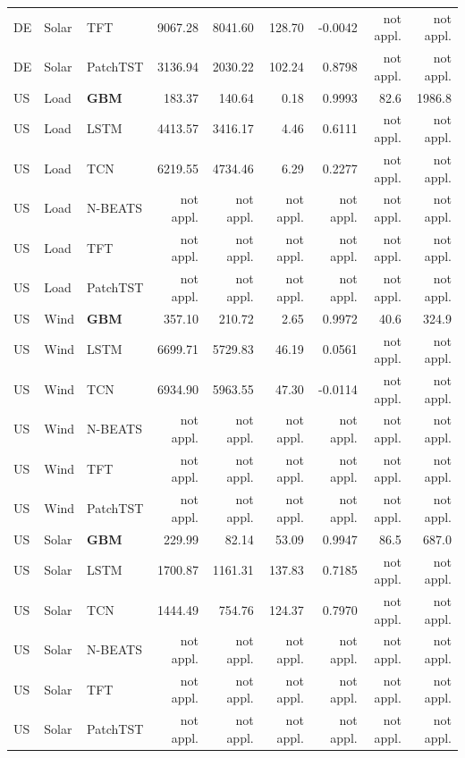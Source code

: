 \begin{table}[htbp]
{\begin{tabular}{lllrrrrrr}
DE & Solar & TFT & 9067.28 & 8041.60 & 128.70 & -0.0042 & not appl. & not appl. \\
DE & Solar & PatchTST & 3136.94 & 2030.22 & 102.24 & 0.8798 & not appl. & not appl. \\
US & Load & \textbf{GBM} & 183.37 & 140.64 & 0.18 & 0.9993 & 82.6 & 1986.8 \\
US & Load & LSTM & 4413.57 & 3416.17 & 4.46 & 0.6111 & not appl. & not appl. \\
US & Load & TCN & 6219.55 & 4734.46 & 6.29 & 0.2277 & not appl. & not appl. \\
US & Load & N-BEATS & not appl. & not appl. & not appl. & not appl. & not appl. & not appl. \\
US & Load & TFT & not appl. & not appl. & not appl. & not appl. & not appl. & not appl. \\
US & Load & PatchTST & not appl. & not appl. & not appl. & not appl. & not appl. & not appl. \\
US & Wind & \textbf{GBM} & 357.10 & 210.72 & 2.65 & 0.9972 & 40.6 & 324.9 \\
US & Wind & LSTM & 6699.71 & 5729.83 & 46.19 & 0.0561 & not appl. & not appl. \\
US & Wind & TCN & 6934.90 & 5963.55 & 47.30 & -0.0114 & not appl. & not appl. \\
US & Wind & N-BEATS & not appl. & not appl. & not appl. & not appl. & not appl. & not appl. \\
US & Wind & TFT & not appl. & not appl. & not appl. & not appl. & not appl. & not appl. \\
US & Wind & PatchTST & not appl. & not appl. & not appl. & not appl. & not appl. & not appl. \\
US & Solar & \textbf{GBM} & 229.99 & 82.14 & 53.09 & 0.9947 & 86.5 & 687.0 \\
US & Solar & LSTM & 1700.87 & 1161.31 & 137.83 & 0.7185 & not appl. & not appl. \\
US & Solar & TCN & 1444.49 & 754.76 & 124.37 & 0.7970 & not appl. & not appl. \\
US & Solar & N-BEATS & not appl. & not appl. & not appl. & not appl. & not appl. & not appl. \\
US & Solar & TFT & not appl. & not appl. & not appl. & not appl. & not appl. & not appl. \\
US & Solar & PatchTST & not appl. & not appl. & not appl. & not appl. & not appl. & not appl. \\
\bottomrule
\end{tabular}%
}
\end{table}
